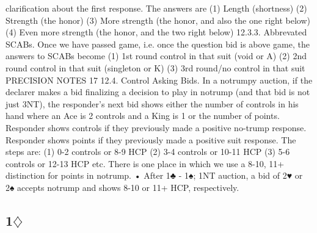 \documentclass[10pt]{article}
\renewcommand{\d}{$\diamondsuit$}
\newcommand{\pdfd}{\texorpdfstring{\d{}}{D}}
\begin{document}
\begin{multicols*}{2}
clarification about the first response. The answers are
(1) Length (shortness)
(2) Strength (the honor)
(3) More strength (the honor, and also the one right below)
(4) Even more strength (the honor, and the two right below)
12.3.3. Abbrevated SCABs. Once we have passed game, i.e. once the question bid
is above game, the answers to SCABs become
(1) 1st round control in that suit (void or A)
(2) 2nd round control in that suit (singleton or K)
(3) 3rd round/no control in that suit
PRECISION NOTES 17
12.4. Control Asking Bids. In a notrumpy auction, if the declarer makes a bid
finalizing a decision to play in notrump (and that bid is not just 3NT), the responder’s next bid shows either the number of controls in his hand where an Ace
is 2 controls and a King is 1 or the number of points. Responder shows controls
if they previously made a positive no-trump response. Responder shows points if
they previously made a positive suit response. The steps are:
(1) 0-2 controls or 8-9 HCP
(2) 3-4 controls or 10-11 HCP
(3) 5-6 controls or 12-13 HCP
etc.
There is one place in which we use a 8-10, 11+ distinction for points in notrump.
• After 1♣ - 1♠; 1NT auction, a bid of 2♥ or 2♠ accepts notrump and shows
8-10 or 11+ HCP, respectively.
\newpage
\subsection{1\pdfd}



\end{multicols*}
\end{document}

